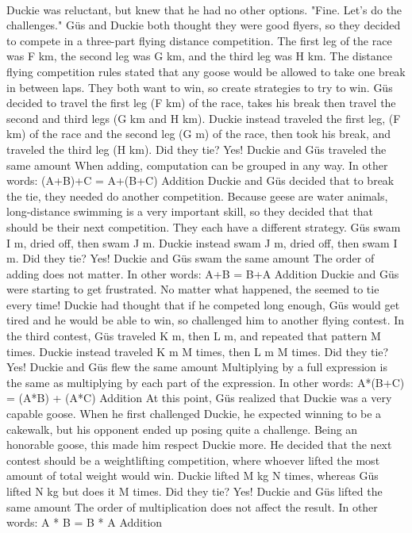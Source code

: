 \documentclass[a4paper,11pt ]{book}
\begin{document}
\paragraph{} Duckie was reluctant, but knew that he had no other options. "Fine. Let's do the challenges."
\pagebreak
{Güs and Duckie both thought they were good flyers, so they decided to compete in a three-part flying distance competition. The first leg of the race was F km, the second leg was G km, and the third leg was H km. The distance flying competition rules stated that any goose would be allowed to take one break in between laps. They both want to win, so create strategies to try to win. Güs decided to travel the first leg (F km) of the race, takes his break then travel the second and third legs (G km and H km). Duckie instead traveled the first leg, (F km) of the race and the second leg (G m) of the race, then took his break, and traveled the third leg (H km). Did they tie?}
{Yes! Duckie and Güs traveled the same amount}
{When adding, computation can be grouped in any way. In other words: (A+B)+C = A+(B+C)}
{Addition}
{Duckie and Güs decided that to break the tie, they needed do another competition. \linebreak Because geese are water animals, long-distance swimming is a very important skill, so they decided that that should be their next competition. They each have a different strategy.  Güs swam I m, dried off, then swam J m. Duckie instead swam J m, dried off, then swam I m. Did they tie?}
{Yes! Duckie and Güs swam the same amount}
{The order of adding does not matter. In other words: A+B = B+A}
{Addition}
{Duckie and Güs were starting to get frustrated. No matter what happened, the seemed to tie every time! Duckie had thought that if he competed long enough, Güs would get tired and he would be able to win, so challenged him to another flying contest. In the third contest, Güs traveled K m, then L m, and repeated that pattern M times. Duckie instead traveled K m M times, then L m M times. Did they tie?}
{Yes! Duckie and Güs flew the same amount}
{Multiplying by a full expression is the same as multiplying by each part of the expression. In other words: A*(B+C) = (A*B) + (A*C)}
{Addition}
{At this point, Güs realized that Duckie was a very capable goose. When he first challenged Duckie, he expected winning to be a cakewalk, but his opponent ended up posing quite a challenge. Being an honorable goose, this made him respect Duckie more. He decided that the next contest should be a weightlifting competition, where whoever lifted the most amount of total weight would win. Duckie lifted M kg N times, whereas Güs lifted N kg but does it M times. Did they tie?}
{Yes! Duckie and Güs lifted the same amount}
{The order of multiplication does not affect the result. In other words: A * B = B * A}
{Addition}
\end{document}
